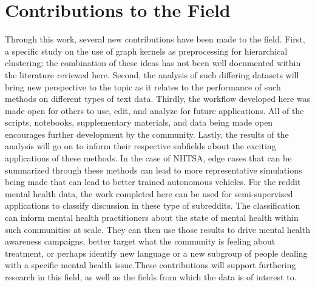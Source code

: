 \section{Contributions to the Field}

\hspace*{0.5cm} Through this work, several new contributions have been made to the field. First, a specific study on the use of graph kernels as preprocessing for hierarchical clustering; the combination of these ideas has not been well documented within the literature reviewed here. Second, the analysis of such differing datasets will bring new perspective to the topic as it relates to the performance of such methods on different types of text data. Thirdly, the workflow developed here was made open for others to use, edit, and analyze for future applications. All of the scripts, notebooks, supplementary materials, and data being made open encourages further development by the community. Lastly, the results of the analysis will go on to inform their respective subfields about the exciting applications of these methods. In the case of NHTSA, edge cases that can be summarized through these methods can lead to more representative simulations being made that can lead to better trained autonomous vehicles. For the reddit mental health data, the work completed here can be used for semi-supervised applications to classify discussion in these type of subreddits. The classification can inform mental health practitioners about the state of mental health within such communities at scale. They can then use those results to drive mental health awareness campaigns, better target what the community is feeling about treatment, or perhaps identify new language or a new subgroup of people dealing with a specific mental health issue.These contributions will support furthering research in this field, as well as the fields from which the data is of interest to. 

 

 


